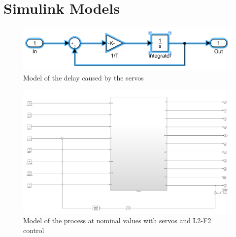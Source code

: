 \documentclass[11pt]{article}
\begin{document}
\section{Simulink Models}
\begin{figure} [H]
\centering	\includegraphics[scale = 0.5]
{servo}
\caption{Model of the delay caused by the servos}
\label{F2_Levels}
\end{figure}

\begin{figure} [H]
\centering	\includegraphics[scale = 0.7]
{process}
\caption{Model of the process at nominal values with servos and L2-F2 control}
\label{F2_Levels}
\end{figure}
\end{document}
